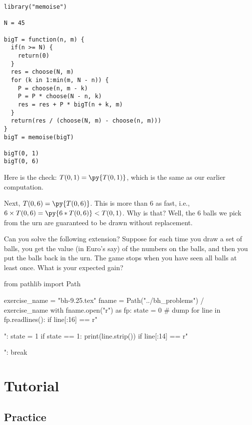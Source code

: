\begin{exercise}
\begin{solution}
\begin{pyblock}
\end{pyblock}
\begin{verbatim}
library("memoise")

N = 45

bigT = function(n, m) {
  if(n >= N) {
    return(0)
  }
  res = choose(N, m)
  for (k in 1:min(m, N - n)) {
    P = choose(n, m - k)
    P = P * choose(N - n, k)
    res = res + P * bigT(n + k, m)
  }
  return(res / (choose(N, m) - choose(n, m)))
}
bigT = memoise(bigT)

bigT(0, 1)
bigT(0, 6)
\end{verbatim}
Here is the check: $T(0, 1) = \py{T(0, 1)}$, which is the same as our earlier computation.

Next, $T(0, 6) = \py{T(0,6)}$.
This is more than $6$ as fast, i.e., $6\times T(0, 6) = \py{6*T(0, 6)} < T(0,1)$.
Why is that?
Well, the 6 balls we pick from the urn are guaranteed to be drawn without replacement.


Can you solve the following extension? Suppose for each time you draw a set of balls, you get the value (in Euro's say) of the numbers on the balls, and then you put the balls back in the urn.
The game stops when you have seen all balls at least once. What is your expected gain?

\end{solution}
\end{exercise}


\begin{pycode}
from pathlib import Path

exercise_name = "bh-9.25.tex"
fname = Path("../bh_problems") / exercise_name
with fname.open("r") as fp:
    state = 0  # dump
    for line in fp.readlines():
        if line[:16] == r"\begin{exercise}":
            state = 1
        if state == 1:
            print(line.strip())
        if line[:14] == r"\end{exercise}":
            break
\end{pycode}


\section{Tutorial}
\label{sec:tutorial}


\subsection{Practice}

